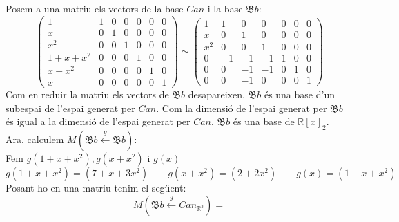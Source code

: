\documentclass[a4paper, 12pt]{article}
\begin{document}
    \begin{solucio}
        Posem a una matriu els vectors de la base $Can$ i la base $\mathfrak{B}b$:
        \begin{displaymath}
            \left(
                \begin{array}{c|cccccc}
                    1 & 1 & 0 & 0 & 0 & 0 & 0\\
                    x & 0 & 1 & 0 & 0 & 0 & 0\\
                    x^2 & 0 & 0 & 1 & 0 & 0 & 0\\
                    \hline
                    1 + x + x^2 & 0 & 0 & 0 & 1 & 0 & 0\\
                    x + x^2 & 0 & 0 & 0 & 0 & 1 & 0\\
                    x & 0 & 0 & 0 & 0 & 0 & 1
                \end{array}
            \right)
            \sim
            \left(
                \begin{array}{c|cccccc}
                    1 & 1 & 0 & 0 & 0 & 0 & 0\\
                    x & 0 & 1 & 0 & 0 & 0 & 0\\
                    x^2 & 0 & 0 & 1 & 0 & 0 & 0\\
                    \hline
                    0 & -1 & -1 & -1 & 1 & 0 & 0\\
                    0 & 0 & -1 & -1 & 0 & 1 & 0\\
                    0 & 0 & -1 & 0 & 0 & 0 & 1
                \end{array}
            \right)
        \end{displaymath}
        Com en reduir la matriu els vectors de $\mathfrak{B}b$ desapareixen, $\mathfrak{B}b$ és una
        base d'un subespai de l'espai generat per $Can$. Com la dimensió de l'espai generat per $\mathfrak{B}b$
        és igual a la dimensió de l'espai generat per $Can$, $\mathfrak{B}b$ és una base de $\mathbb{R}[x]_2$.\\
        Ara, calculem $M(\mathfrak{B}b \xleftarrow{g} \mathfrak{B}b)$:\\
        Fem $g(1+x+x^2), g(x+x^2)\text{ i }g(x)$
        \begin{displaymath}
            g(1+x+x^2) = (7+x+3x^2)\qquad g(x+x^2) = (2+2x^2)\qquad g(x) = (1-x+x^2)
        \end{displaymath}
        Posant-ho en una matriu tenim el següent:
        \begin{displaymath}
            M(\mathfrak{B}b \xleftarrow{g} Can_{\mathbb{R}^3}) =

\end{displaymath}
\end{solucio}
\end{document}
